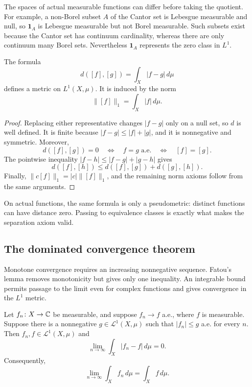 \begin{remark}
  The spaces of actual measurable functions can differ before taking
  the quotient. For example, a non-Borel subset $A$ of the Cantor set
  is Lebesgue measurable and null, so $\mathbf 1_A$ is Lebesgue
  measurable but not Borel measurable. Such subsets exist because
  the Cantor set has continuum cardinality, whereas there are only
  continuum many Borel sets. Nevertheless $\mathbf 1_A$ represents
  the zero class in $L^1$.
\end{remark}

\begin{proposition}
  \label{prop:l1-metric-sep-24}
  The formula
  \[
    d([f],[g])=\int_X|f-g|\,d\mu
  \]
  defines a metric on $L^1(X,\mu)$. It is induced by the norm
  \[
    \|[f]\|_1=\int_X|f|\,d\mu.
  \]
\end{proposition}

\begin{proof}
  Replacing either representative changes $|f-g|$ only on a null set,
  so $d$ is well defined. It is finite because
  $|f-g|\leq|f|+|g|$, and it is nonnegative and symmetric. Moreover,
  \[
    d([f],[g])=0\quad\Longleftrightarrow\quad f=g\text{ a.e.}
      \quad\Longleftrightarrow\quad[f]=[g].
  \]
  The pointwise inequality $|f-h|\leq|f-g|+|g-h|$ gives
  \[
    d([f],[h])\leq d([f],[g])+d([g],[h]).
  \]
  Finally, $\|c[f]\|_1=|c|\|[f]\|_1$, and the remaining norm axioms
  follow from the same arguments.
\end{proof}

On actual functions, the same formula is only a pseudometric: distinct
functions can have distance zero. Passing to equivalence classes is
exactly what makes the separation axiom valid.

\FloatBarrier

\subsection{The dominated convergence theorem}

Monotone convergence requires an increasing nonnegative sequence.
Fatou's lemma removes monotonicity but gives only one inequality.
An integrable bound permits passage to the limit even for complex
functions and gives convergence in the $L^1$ metric.

\begin{theorem}
  \label{thm:dct-sep-24}
  Let $f_n\colon X\to\mathbb{C}$ be measurable, and suppose $f_n\to f$
  a.e., where $f$ is measurable. Suppose there is a nonnegative
  $g\in\mathcal L^1(X,\mu)$ such that $|f_n|\leq g$ a.e. for every
  $n$. Then $f_n,f\in\mathcal L^1(X,\mu)$ and
  \[
    \lim_{n\to\infty}\int_X|f_n-f|\,d\mu=0.
  \]
  Consequently,
  \[
    \lim_{n\to\infty}\int_X f_n\,d\mu=\int_X f\,d\mu.
  \]
\end{theorem}

